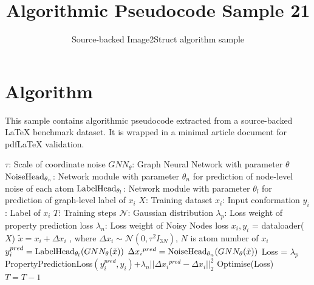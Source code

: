 \documentclass[11pt]{article}
\title{Algorithmic Pseudocode Sample 21}
\author{Source-backed Image2Struct algorithm sample}
\date{}
\begin{document}
\maketitle
\section{Algorithm}
This sample contains algorithmic pseudocode extracted from a source-backed LaTeX benchmark dataset. It is wrapped in a minimal article document for pdfLaTeX validation.

\begin{algorithm}[htbp]
\caption{Source-backed algorithmic procedure}
\begin{algorithmic}[1]
\Require
\Statex$\tau$: Scale of coordinate noise
\Statex$GNN_{\theta}$: Graph Neural Network with parameter $\theta$
\Statex ${\rm NoiseHead}_{\theta_{n}}$: Network module with parameter $\theta_{n}$ for prediction of node-level noise of each atom
\Statex ${\rm LabelHead}_{\theta_{l}}$: Network module with parameter $\theta_{l}$ for prediction of graph-level label of $x_{i}$
\Statex$X$: Training dataset
\Statex$x_i$: Input conformation
\Statex$y_i$: Label of $x_i$
\Statex$T$: Training steps
\Statex$\mathcal N$: Gaussian distribution
\Statex$\lambda_{p}$: Loss weight of property prediction loss
\Statex$\lambda_{n}$: Loss weight of Noisy Nodes loss
\State $x_i, y_i$ = dataloader($X$) 
\State $\tilde{x} = x_{i} + \Delta{x_i}$ , where $\Delta{x_i} \sim \mathcal{N}(0, {\tau}^2I_{3N})$, $N$ is atom number of $x_i$
\State $y_{i}^{pred}={\rm LabelHead}_{\theta_{l}}(GNN_{\theta}(\tilde{x}))$
\State $\Delta{x_i}^{pred}={\rm NoiseHead}_{\theta_{n}}(GNN_{\theta}(\tilde{x}))$
\State Loss = $\lambda_{p}$PropertyPredictionLoss$(y_{i}^{pred}, y_i)$+$\lambda_{n}||\Delta{x_i}^{pred} - \Delta{x_i}||_{2}^{2}$
\State Optimise(Loss)
\State $T = T - 1$
\EndWhile
\end{algorithmic}
\end{algorithm}
\end{document}
